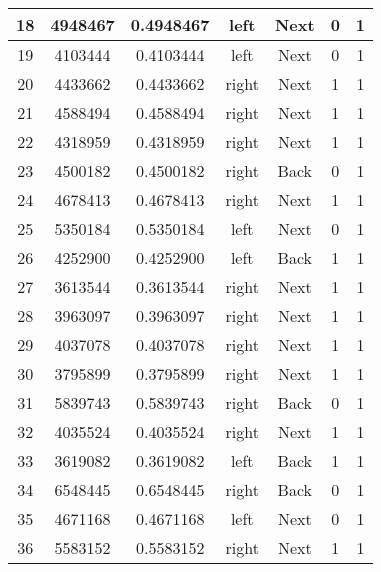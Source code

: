 \documentclass{jlreq}
\numberwithin{equation}{section}
\begin{document}
\begin{table}[H]
{\begin{tabular}{|c|c|c|c|c|c|c|}
      18           & 4948467          & 0.4948467      & left      & Next & 0     & 1   \\ \hline
      19           & 4103444          & 0.4103444      & left      & Next & 0     & 1   \\ \hline
      20           & 4433662          & 0.4433662      & right     & Next & 1     & 1   \\ \hline
      21           & 4588494          & 0.4588494      & right     & Next & 1     & 1   \\ \hline
      22           & 4318959          & 0.4318959      & right     & Next & 1     & 1   \\ \hline
      23           & 4500182          & 0.4500182      & right     & Back & 0     & 1   \\ \hline
      24           & 4678413          & 0.4678413      & right     & Next & 1     & 1   \\ \hline
      25           & 5350184          & 0.5350184      & left      & Next & 0     & 1   \\ \hline
      26           & 4252900          & 0.4252900      & left      & Back & 1     & 1   \\ \hline
      27           & 3613544          & 0.3613544      & right     & Next & 1     & 1   \\ \hline
      28           & 3963097          & 0.3963097      & right     & Next & 1     & 1   \\ \hline
      29           & 4037078          & 0.4037078      & right     & Next & 1     & 1   \\ \hline
      30           & 3795899          & 0.3795899      & right     & Next & 1     & 1   \\ \hline
      31           & 5839743          & 0.5839743      & right     & Back & 0     & 1   \\ \hline
      32           & 4035524          & 0.4035524      & right     & Next & 1     & 1   \\ \hline
      33           & 3619082          & 0.3619082      & left      & Back & 1     & 1   \\ \hline
      34           & 6548445          & 0.6548445      & right     & Back & 0     & 1   \\ \hline
      35           & 4671168          & 0.4671168      & left      & Next & 0     & 1   \\ \hline
      36           & 5583152          & 0.5583152      & right     & Next & 1     & 1   \\ \hline

\end{tabular}}
\end{table}
\end{document}
